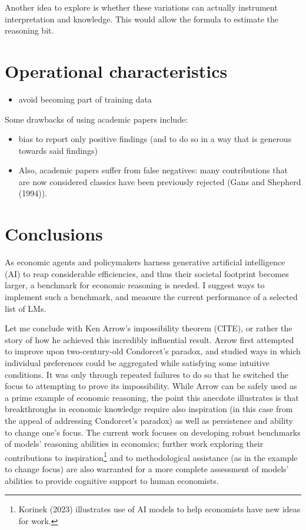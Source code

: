 \documentclass[
]{article}
\providecommand{\tightlist}{%
  \setlength{\itemsep}{0pt}\setlength{\parskip}{0pt}}\usepackage{longtable,booktabs,array}
\begin{document}
Another idea to explore is whether these variations can actually
instrument interpretation and knowledge. This would allow the formula to
estimate the reasoning bit.

\section{Operational characteristics}\label{operational-characteristics}

\begin{itemize}
\tightlist
\item
  avoid becoming part of training data
\end{itemize}

Some drawbacks of using academic papers include:

\begin{itemize}
\tightlist
\item
  bias to report only positive findings (and to do so in a way that is
  generous towards said findings)
\item
  Also, academic papers suffer from false negatives: many contributions
  that are now considered classics have been previously rejected (Gans
  and Shepherd (1994)).
\end{itemize}

\section{Conclusions}\label{conclusions}

As economic agents and policymakers harness generative artificial
intelligence (AI) to reap considerable efficiencies, and thus their
societal footprint becomes larger, a benchmark for economic reasoning is
needed. I suggest ways to implement such a benchmark, and measure the
current performance of a selected list of LMs.

Let me conclude with Ken Arrow's impossibility theorem (CITE), or rather
the story of how he achieved this incredibly influential result. Arrow
first attempted to improve upon two-century-old Condorcet's paradox, and
studied ways in which individual preferences could be aggregated while
satisfying some intuitive conditions. It was only through repeated
failures to do so that he switched the focus to attempting to prove its
impossibility. While Arrow can be safely used as a prime example of
economic reasoning, the point this anecdote illustrates is that
breakthroughs in economic knowledge require also inspiration (in this
case from the appeal of addressing Condorcet's paradox) as well as
persistence and ability to change one's focus. The current work focuses
on developing robust benchmarks of models' reasoning abilities in
economics; further work exploring their contributions to
inspiration\footnote{Korinek (2023) illustrates use of AI models to help
  economists have new ideas for work.} and to methodological assistance
(as in the example to change focus) are also warranted for a more
complete assessment of models' abilities to provide cognitive support to
human economists.
\end{document}
